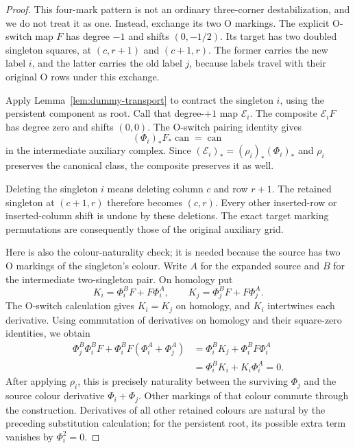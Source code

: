 \documentclass[11pt,a4paper]{article}
\theoremstyle{remark}
\begin{document}
\begin{proof}
This four-mark pattern is not an ordinary three-corner
destabilization, and we do not treat it as one.  Instead, exchange its
two O markings.  The explicit O-switch map $F$ has degree $-1$ and
shifts $(0,-1/2)$.  Its target has two doubled singleton squares, at
$(c,r+1)$ and $(c+1,r)$.  The former carries the new label $i$, and
the latter carries the old label $j$, because labels travel with their
original O rows under this exchange.

Apply Lemma~\ref{lem:dummy-transport} to contract the singleton $i$,
using the persistent component as root.  Call that degree-$+1$ map
$\mathcal E_i$.  The composite $\mathcal E_i F$ has degree zero and
shifts $(0,0)$.  The O-switch pairing identity gives
\[
 (\Phi_i)_*F_*\operatorname{can}
 =\operatorname{can}
\]
in the intermediate auxiliary complex.  Since
$(\mathcal E_i)_*=(\rho_i)_*(\Phi_i)_*$ and $\rho_i$ preserves the
canonical class, the composite preserves it as well.

Deleting the singleton $i$ means deleting column $c$ and row $r+1$.
The retained singleton at $(c+1,r)$ therefore becomes $(c,r)$.
Every other inserted-row or inserted-column shift is undone by these
deletions.  The exact target marking permutations are consequently
those of the original auxiliary grid.

Here is also the colour-naturality check; it is needed because the
source has two O markings of the singleton's colour.  Write $A$ for
the expanded source and $B$ for the intermediate two-singleton pair.
On homology put
\[
 K_i=\Phi_i^B F+F\Phi_i^A,
 \qquad K_j=\Phi_j^B F+F\Phi_j^A.
\]
The O-switch calculation gives $K_i=K_j$ on homology, and $K_i$
intertwines each derivative.  Using commutation of derivatives on
homology and their square-zero identities, we obtain
\begin{align*}
 \Phi_j^B\Phi_i^B F
       +\Phi_i^B F(\Phi_i^A+\Phi_j^A)
 &=\Phi_i^B K_j+\Phi_i^B F\Phi_i^A\\
 &=\Phi_i^B K_i+K_i\Phi_i^A=0.
\end{align*}
After applying $\rho_i$, this is precisely naturality between the
surviving $\Phi_j$ and the source colour derivative
$\Phi_i+\Phi_j$.  Other markings of that colour commute through the
construction.  Derivatives of all other retained colours are natural
by the preceding substitution calculation; for the persistent root,
its possible extra term vanishes by $\Phi_i^2=0$.
\end{proof}
\end{document}
